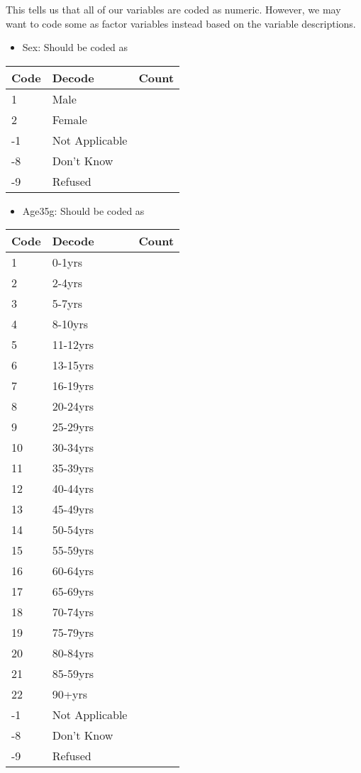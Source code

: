 \documentclass[
  11pt,
]{article}
\providecommand{\tightlist}{%
  \setlength{\itemsep}{0pt}\setlength{\parskip}{0pt}}
\begin{document}
This tells us that all of our variables are coded as numeric. However,
we may want to code some as factor variables instead based on the
variable descriptions.

\begin{itemize}
\tightlist
\item
  Sex: Should be coded as
\end{itemize}

\begin{longtable}[]{@{}lll@{}}
\toprule()
Code & Decode & Count \\
\midrule()
\endhead
1 & Male & \\
2 & Female & \\
-1 & Not Applicable & \\
-8 & Don't Know & \\
-9 & Refused & \\
\bottomrule()
\end{longtable}

\begin{itemize}
\tightlist
\item
  Age35g: Should be coded as
\end{itemize}

\begin{longtable}[]{@{}lll@{}}
\toprule()
Code & Decode & Count \\
\midrule()
\endhead
1 & 0-1yrs & \\
2 & 2-4yrs & \\
3 & 5-7yrs & \\
4 & 8-10yrs & \\
5 & 11-12yrs & \\
6 & 13-15yrs & \\
7 & 16-19yrs & \\
8 & 20-24yrs & \\
9 & 25-29yrs & \\
10 & 30-34yrs & \\
11 & 35-39yrs & \\
12 & 40-44yrs & \\
13 & 45-49yrs & \\
14 & 50-54yrs & \\
15 & 55-59yrs & \\
16 & 60-64yrs & \\
17 & 65-69yrs & \\
18 & 70-74yrs & \\
19 & 75-79yrs & \\
20 & 80-84yrs & \\
21 & 85-59yrs & \\
22 & 90+yrs & \\
-1 & Not Applicable & \\
-8 & Don't Know & \\
-9 & Refused & \\
\bottomrule()
\end{longtable}
\end{document}
